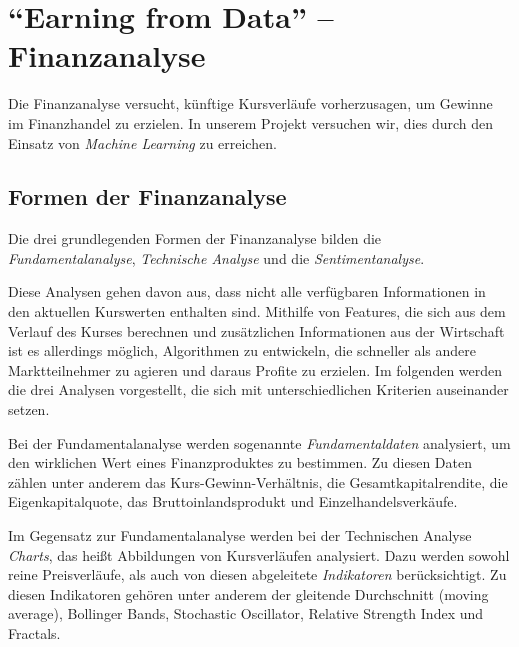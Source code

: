\section{\enquote{Earning from Data} -- Finanzanalyse}
\label{sec:FinanzenIntro}

Die Finanzanalyse versucht, künftige Kursverläufe vorherzusagen, um Gewinne im Finanzhandel zu erzielen. In unserem Projekt versuchen wir, dies durch den Einsatz von \emph{Machine Learning} zu erreichen.

\subsection{Formen der Finanzanalyse}
\label{ssec:FinanzanalyseFormenIntro}

Die drei grundlegenden Formen der Finanzanalyse bilden die \emph{Fundamentalanalyse}, \emph{Technische Analyse} und die \emph{Sentimentanalyse}. 

Diese Analysen gehen davon aus, dass nicht alle verfügbaren Informationen in den aktuellen Kurswerten enthalten sind. Mithilfe von Features, die sich aus dem Verlauf des Kurses berechnen und zus\"atzlichen Informationen aus der Wirtschaft ist es allerdings möglich, Algorithmen zu entwickeln, die schneller als andere Marktteilnehmer zu agieren und daraus Profite zu erzielen. Im folgenden werden die drei Analysen vorgestellt, die sich mit unterschiedlichen Kriterien auseinander setzen.  


Bei der Fundamentalanalyse werden sogenannte \emph{Fundamentaldaten} analysiert, um den wirklichen Wert eines Finanzproduktes zu bestimmen. Zu diesen Daten zählen unter anderem das Kurs-Gewinn-Verhältnis, die Gesamtkapitalrendite, die Eigenkapitalquote, das Bruttoinlandsprodukt und Einzelhandelsverkäufe.

Im Gegensatz zur Fundamentalanalyse werden bei der Technischen Analyse \emph{Charts}, das heißt Abbildungen von Kursverläufen analysiert. Dazu werden sowohl reine Preisverläufe, als auch von diesen abgeleitete \emph{Indikatoren} berücksichtigt. Zu diesen Indikatoren gehören unter anderem der gleitende Durchschnitt (moving average), Bollinger Bands, Stochastic Oscillator, Relative Strength Index und Fractals.

